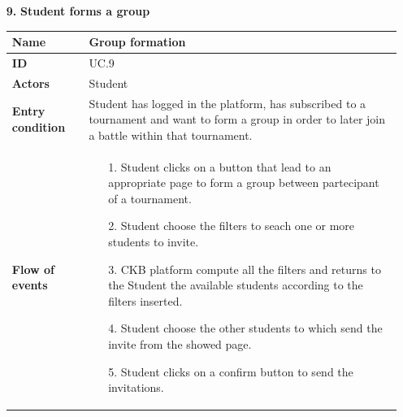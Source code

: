 \documentclass{article}
\begin{document}
{\begin{enumerate}
                    \item[\textbf{9.}] \textbf{Student forms a group}
                    \begin{xltabular}{\textwidth}
                        {| >{\raggedright\arraybackslash}g | >{\raggedright\arraybackslash}X |}      
                        \hline
                        \endfirsthead
                        \hline
                        \endhead
                        \endfoot
                        \hline
                        \endlastfoot
                        

                        
                        
                        \textbf{Name} & Group formation\\
                        \hline
                        \textbf{ID} & UC.9\\
                        \hline
                        \textbf{Actors} & Student\\
                        \hline
                        \textbf{Entry condition} & Student has logged in the platform, has subscribed to a 
                        tournament and want to form a group in order to later join a battle within that 
                        tournament.\\
                        \hline
                        \textbf{Flow of events} &    \begin{enumerate}
                                                        \item[1.] Student clicks on a button that lead to 
                                                        an appropriate page to form a group between partecipant
                                                        of a tournament.
                                                        \item[2.] Student choose the filters to seach one or more
                                                        students to invite.
                                                        \item[3.] CKB platform compute all the filters and returns to
                                                        the Student the available students according to the filters inserted.
                                                        \item[4.] Student choose the other students to which send
                                                        the invite from the showed page.
                                                        \item[5.] Student clicks on a confirm button to send the invitations.

\end{enumerate}
\end{xltabular}
\end{enumerate}}
\end{document}
